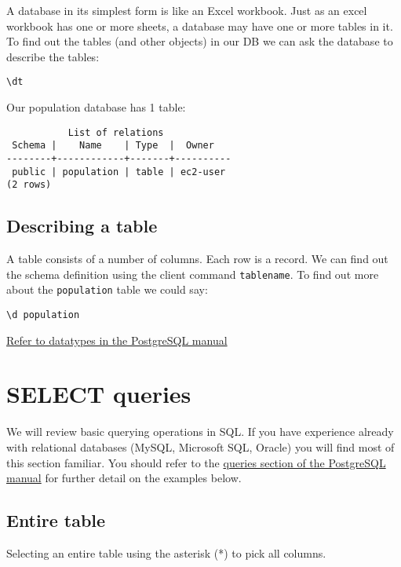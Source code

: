 A database in its simplest form is like an Excel workbook.
Just as an excel workbook has one or more sheets, a database may have one or more tables in it.
To find out the tables (and other objects) in our DB we can ask the database to describe the tables:

\begin{verbatim}
\dt
\end{verbatim}

Our population database has 1 table:

\begin{verbatim}
           List of relations
 Schema |    Name    | Type  |  Owner   
--------+------------+-------+----------
 public | population | table | ec2-user
(2 rows)
\end{verbatim}

\subsection{Describing a table}\label{describing-a-table}

A table consists of a number of columns. Each row is a record. We can
find out the schema definition using the client command
\texttt{tablename}. To find out more about the \texttt{population} table
we could say:

\begin{verbatim}
\d population
\end{verbatim}

\href{https://www.postgresql.org/docs/13/datatype.html}{Refer to
datatypes in the PostgreSQL manual}

\section{SELECT queries}\label{select-queries}

We will review basic querying operations in SQL.
If you have experience already with relational databases (MySQL, Microsoft SQL, Oracle) you will find most of this section familiar.
You should refer to the \href{https://www.postgresql.org/docs/13/queries.html}{queries section of the PostgreSQL manual} for further detail on the examples below.

\subsection{Entire table}\label{entire-table}

Selecting an entire table using the asterisk (*) to pick all columns.

